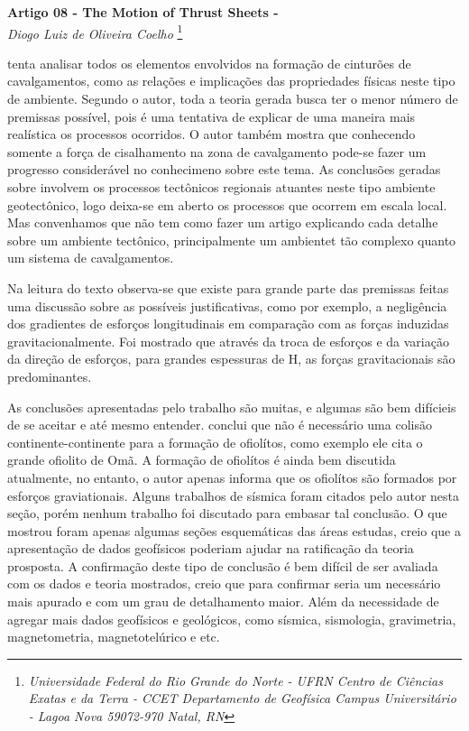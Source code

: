 \documentclass[manuscript]{geophysics}[10pt]
\begin{document}
\begin{center}
\textbf{\LARGE
 Artigo 08 - The Motion of Thrust Sheets - \cite{elliott_motion_1976}} \\
\textit{Diogo Luiz de Oliveira Coelho}
\footnote{\textit{Universidade Federal do Rio Grande do Norte - UFRN
Centro de Ciências Exatas e da Terra - CCET
Departamento de Geofísica
Campus Universitário - Lagoa Nova
59072-970 Natal, RN}}
\end{center} 

\cite{elliott_motion_1976} tenta analisar todos os elementos envolvidos na formação de cinturões de cavalgamentos, como as relações e implicações das propriedades físicas neste tipo de ambiente. Segundo o autor, toda a teoria gerada busca ter o menor número de premissas possível, pois é uma tentativa de explicar de uma maneira mais realística os processos ocorridos. O autor também mostra que conhecendo somente a força de cisalhamento na zona de cavalgamento pode-se fazer um progresso considerável no conhecimeno sobre este tema. As conclusões geradas sobre involvem os processos tectônicos regionais atuantes neste tipo ambiente geotectônico, logo deixa-se em aberto os processos que ocorrem em escala local. Mas convenhamos que não tem como fazer um artigo explicando cada detalhe sobre um ambiente tectônico, principalmente um ambientet tão complexo quanto um sistema de cavalgamentos.

Na leitura do texto observa-se que existe para grande parte das premissas feitas uma discussão sobre as possíveis justificativas, como por exemplo, a negligência dos gradientes de esforços longitudinais em comparação com as forças induzidas gravitacionalmente. Foi mostrado que através da troca de esforços e da variação da direção de esforços, para grandes espessuras de H, as forças gravitacionais são predominantes.

As conclusões apresentadas pelo trabalho são muitas, e algumas são bem difícieis de se aceitar e até mesmo entender. \cite{elliott_motion_1976} conclui que não é necessário uma colisão continente-continente para a formação de ofiolítos, como exemplo ele cita o grande ofiolito de Omã. A formação de ofiolítos é ainda bem discutida atualmente, no entanto, o autor apenas informa que os ofiolítos são formados por esforços graviationais. Alguns trabalhos de sísmica foram citados pelo autor nesta seção, porém nenhum trabalho foi discutado para embasar tal conclusão. O que \cite{elliott_motion_1976} mostrou foram apenas algumas seções esquemáticas das áreas estudas, creio que a apresentação de dados geofísicos poderiam ajudar na ratificação da teoria prosposta. A confirmação deste tipo de conclusão é bem difícil de ser avaliada com os dados e teoria mostrados, creio que para confirmar seria um necessário mais apurado e com um grau de detalhamento maior. Além da necessidade de agregar mais dados geofísicos e geológicos, como sísmica, sismologia, gravimetria, magnetometria, magnetotelúrico e etc.
\end{document}

